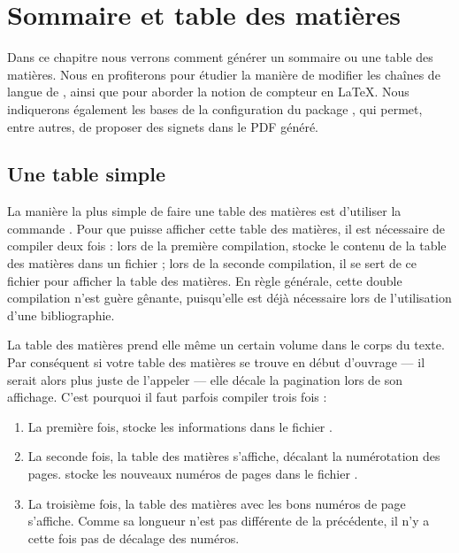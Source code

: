 \chapter{Sommaire et table des matières}\label{toc}

\begin{intro}
Dans ce chapitre nous verrons comment générer un sommaire ou une table des matières. Nous en profiterons pour étudier la manière de modifier les chaînes de langue de , ainsi que pour aborder la notion de compteur en \LaTeX{}. Nous indiquerons également les bases de la configuration du package , qui permet, entre autres, de proposer des signets dans le PDF généré.
\end{intro}

\section{Une table simple}

La manière la plus simple de faire une table des matières est d'utiliser la commande .
Pour que \XeLaTeX{} puisse afficher cette table des matières, il est nécessaire de compiler deux fois : lors de la première compilation, \XeLaTeX{} stocke le contenu de la table des matières dans un fichier  ; lors de la seconde compilation, il se sert de ce fichier pour afficher la table des matières. En règle générale, cette double compilation n'est guère gênante, puisqu'elle est déjà nécessaire lors de l'utilisation d'une bibliographie.

\begin{attention}
La table des matières prend elle même un certain volume dans le corps du texte. Par conséquent si votre table des matières se trouve en début d'ouvrage --- il serait alors plus juste de l'appeler  --- elle décale la pagination lors de son affichage. C'est pourquoi il faut parfois compiler trois fois :

\begin{enumerate}
\item La première fois, \XeLaTeX{} stocke les informations dans le fichier .
\item La seconde fois, la table des matières  s'affiche, décalant la numérotation des pages. \XeLaTeX{}  stocke les nouveaux numéros de pages  dans le fichier .
\item La troisième fois, la table des matières avec les bons numéros de page   s'affiche. Comme sa longueur n'est pas différente de la précédente, il n'y a cette fois pas de décalage des numéros.
\end{enumerate}

\end{attention}

